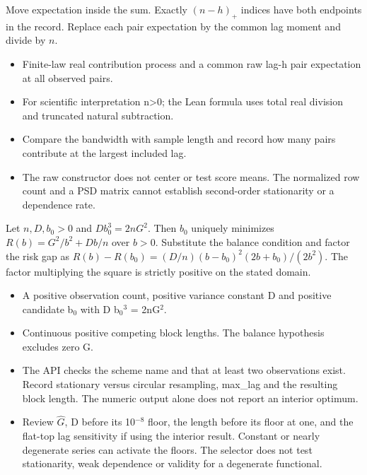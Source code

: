 \expandafter\def\csname statadic@proof@STATADIC-HAC-002\endcsname{Move expectation inside the sum. Exactly $(n-h)_+$ indices
  have both endpoints in the record. Replace each pair expectation by the
  common lag moment and divide by $n$.}
\expandafter\def\csname statadic@assumptions@STATADIC-HAC-002\endcsname{\begin{itemize}
\item Finite-law real contribution process and a common raw lag-h pair expectation at all observed pairs.
\item For scientific interpretation n>0; the Lean formula uses total real division and truncated natural subtraction.
\end{itemize}}
\expandafter\def\csname statadic@diagnostics@STATADIC-HAC-002\endcsname{\begin{itemize}
\item Compare the bandwidth with sample length and record how many pairs contribute at the largest included lag.
\item The raw constructor does not center or test score means. The normalized row count and a PSD matrix cannot establish second-order stationarity or a dependence rate.
\end{itemize}}
\expandafter\def\csname statadic@statement@STATADIC-BLOCKLENGTH-001\endcsname{Let $n,D,b_0>0$ and $D b_0^3=2nG^2$. Then
  $b_0$ uniquely minimizes $R(b)=G^2/b^2+Db/n$ over $b>0$.}
\expandafter\def\csname statadic@proof@STATADIC-BLOCKLENGTH-001\endcsname{Substitute the balance condition and factor the risk gap as
  $R(b)-R(b_0)=(D/n)(b-b_0)^2(2b+b_0)/(2b^2)$.
  The factor multiplying the square is strictly positive on the stated domain.}
\expandafter\def\csname statadic@assumptions@STATADIC-BLOCKLENGTH-001\endcsname{\begin{itemize}
\item A positive observation count, positive variance constant D and positive candidate b\ensuremath{{}_0} with D b\ensuremath{{}_0}\ensuremath{{}^3} = 2nG\ensuremath{{}^2}.
\item Continuous positive competing block lengths. The balance hypothesis excludes zero G.
\end{itemize}}
\expandafter\def\csname statadic@diagnostics@STATADIC-BLOCKLENGTH-001\endcsname{\begin{itemize}
\item The API checks the scheme name and that at least two observations exist. Record stationary versus circular resampling, max\_lag and the resulting block length. The numeric output alone does not report an interior optimum.
\item Review \ensuremath{\hat G}, D before its 10\ensuremath{{}^{-8}} floor, the length before its floor at one, and the flat-top lag sensitivity if using the interior result. Constant or nearly degenerate series can activate the floors. The selector does not test stationarity, weak dependence or validity for a degenerate functional.
\end{itemize}}

